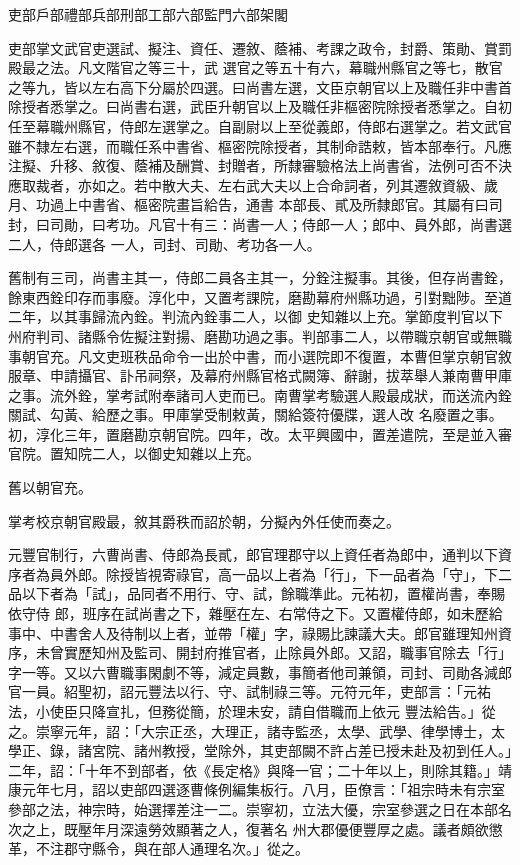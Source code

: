 
\begin{pinyinscope}

 吏部戶部禮部兵部刑部工部六部監門六部架閣



 吏部掌文武官吏選試、擬注、資任、遷敘、蔭補、考課之政令，封爵、策勛、賞罰殿最之法。凡文階官之等三十，武
 選官之等五十有六，幕職州縣官之等七，散官之等九，皆以左右高下分屬於四選。曰尚書左選，文臣京朝官以上及職任非中書首除授者悉掌之。曰尚書右選，武臣升朝官以上及職任非樞密院除授者悉掌之。自初任至幕職州縣官，侍郎左選掌之。自副尉以上至從義郎，侍郎右選掌之。若文武官雖不隸左右選，而職任系中書省、樞密院除授者，其制命誥敕，皆本部奉行。凡應注擬、升移、敘復、蔭補及酬賞、封贈者，所隸審驗格法上尚書省，法例可否不決應取裁者，亦如之。若中散大夫、左右武大夫以上合命詞者，列其遷敘資級、歲月、功過上中書省、樞密院畫旨給告，通書
 本部長、貳及所隸郎官。其屬有曰司封，曰司勛，曰考功。凡官十有三：尚書一人；侍郎一人；郎中、員外郎，尚書選二人，侍郎選各
 一人，司封、司勛、考功各一人。



 舊制有三司，尚書主其一，侍郎二員各主其一，分銓注擬事。其後，但存尚書銓，餘東西銓印存而事廢。淳化中，又置考課院，磨勘幕府州縣功過，引對黜陟。至道二年，以其事歸流內銓。判流內銓事二人，以御
 史知雜以上充。掌節度判官以下州府判司、諸縣令佐擬注對揚、磨勘功過之事。判部事二人，以帶職京朝官或無職事朝官充。凡文吏班秩品命令一出於中書，而小選院即不復置，本曹但掌京朝官敘服章、申請攝官、訃吊祠祭，及幕府州縣官格式闕簿、辭謝，拔萃舉人兼南曹甲庫之事。流外銓，掌考試附奉諸司人吏而已。南曹掌考驗選人殿最成狀，而送流內銓關試、勾黃、給歷之事。甲庫掌受制敕黃，關給簽符優牒，選人改
 名廢置之事。初，淳化三年，置磨勘京朝官院。四年，改。太平興國中，置差遣院，至是並入審官院。置知院二人，以御史知雜以上充。



 舊以朝官充。



 掌考校京朝官殿最，敘其爵秩而詔於朝，分擬內外任使而奏之。



 元豐官制行，六曹尚書、侍郎為長貳，郎官理郡守以上資任者為郎中，通判以下資序者為員外郎。除授皆視寄祿官，高一品以上者為「行」，下一品者為「守」，下二品以下者為「試」，品同者不用行、守、試，餘職準此。元祐初，置權尚書，奉賜依守侍
 郎，班序在試尚書之下，雜壓在左、右常侍之下。又置權侍郎，如未歷給事中、中書舍人及待制以上者，並帶「權」字，祿賜比諫議大夫。郎官雖理知州資序，未曾實歷知州及監司、開封府推官者，止除員外郎。又詔，職事官除去「行」字一等。又以六曹職事閑劇不等，減定員數，事簡者他司兼領，司封、司勛各減郎官一員。紹聖初，詔元豐法以行、守、試制祿三等。元符元年，吏部言：「元祐法，小使臣只降宣扎，但務從簡，於理未安，請自借職而上依元
 豐法給告。」從之。崇寧元年，詔：「大宗正丞，大理正，諸寺監丞，太學、武學、律學博士，太學正、錄，諸宮院、諸州教授，堂除外，其吏部闕不許占差已授未赴及初到任人。」二年，詔：「十年不到部者，依《長定格》與降一官；二十年以上，則除其籍。」靖康元年七月，詔以吏部四選逐曹條例編集板行。八月，臣僚言：「祖宗時未有宗室參部之法，神宗時，始選擇差注一二。崇寧初，立法大優，宗室參選之日在本部名次之上，既壓年月深遠勞效顯著之人，復著名
 州大郡優便豐厚之處。議者頗欲懲革，不注郡守縣令，與在部人通理名次。」從之。




\end{pinyinscope}
